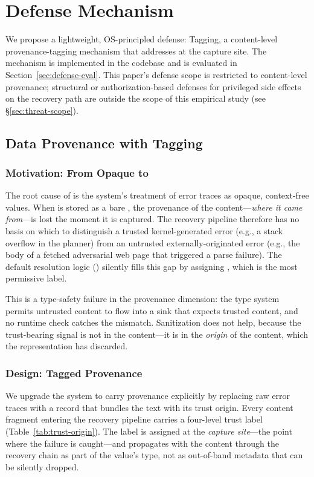 
\section{Defense Mechanism}
\label{sec:defense}

We propose a lightweight, OS-principled defense: \trustorigin{} Tagging, a content-level provenance-tagging mechanism that addresses \rci{} at the capture site. The mechanism is implemented in the \system{} codebase and is evaluated in Section~\ref{sec:defense-eval}. This paper's defense scope is restricted to content-level provenance; structural or authorization-based defenses for privileged side effects on the recovery path are outside the scope of this empirical study (see \S\ref{sec:threat-scope}).

\subsection{Data Provenance with \trustorigin{} Tagging}
\label{sec:trustorigin}

\subsubsection{Motivation: From Opaque  to }
The root cause of \rci{} is the system's treatment of error traces as opaque, context-free  values. When  is stored as a bare , the provenance of the content---\emph{where it came from}---is lost the moment it is captured. The recovery pipeline therefore has no basis on which to distinguish a trusted kernel-generated error (e.g., a stack overflow in the planner) from an untrusted externally-originated error (e.g., the body of a fetched adversarial web page that triggered a parse failure). The default resolution logic () silently fills this gap by assigning , which is the most permissive label.

This is a type-safety failure in the provenance dimension: the type system permits untrusted content to flow into a sink that expects trusted content, and no runtime check catches the mismatch. Sanitization does not help, because the trust-bearing signal is not in the content---it is in the \emph{origin} of the content, which the  representation has discarded.

\subsubsection{Design: Tagged Provenance}
We upgrade the system to carry provenance explicitly by replacing raw  error traces with a  record that bundles the text with its trust origin. Every content fragment entering the recovery pipeline carries a four-level trust label (Table~\ref{tab:trust-origin}). The label is assigned at the \emph{capture site}---the point where the failure is caught---and propagates with the content through the recovery chain as part of the value's type, not as out-of-band metadata that can be silently dropped.

